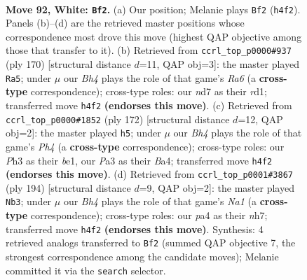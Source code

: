 \documentclass[11pt]{article}
\begin{document}
\clearpage

\begin{figure}[p]\centering
\begin{subfigure}{0.46\textwidth}\centering
\resizebox{\linewidth}{!}{%
\newchessgame
\chessboard[
  setfen={6k1/3n4/8/5P2/p4K1B/P6P/8/8 w - - 3 92},
  showmover=false,
  pgfstyle=straightmove, color=movearrow, markmove={h4-f2}
]}
\caption{}
\end{subfigure}\hfill
\begin{subfigure}{0.46\textwidth}\centering
\resizebox{\linewidth}{!}{%
\newchessgame
\chessboard[
  setfen={8/5k2/R7/6p1/6P1/4P3/5K2/3r4 w - - 37 86},
  showmover=false,
  pgfstyle=straightmove, color=movearrow, markmove={a6-a5}
]}
\caption{}
\end{subfigure}
\\[4pt]
\begin{subfigure}{0.46\textwidth}\centering
\resizebox{\linewidth}{!}{%
\newchessgame
\chessboard[
  setfen={8/8/3p1k2/3P4/B3K2P/8/8/4b3 w - - 14 87},
  showmover=false,
  pgfstyle=straightmove, color=movearrow, markmove={h4-h5}
]}
\caption{}
\end{subfigure}\hfill
\begin{subfigure}{0.46\textwidth}\centering
\resizebox{\linewidth}{!}{%
\newchessgame
\chessboard[
  setfen={2k5/5P1n/2PK4/8/8/8/p7/N7 w - - 11 98},
  showmover=false,
  pgfstyle=straightmove, color=movearrow, markmove={a1-b3}
]}
\caption{}
\end{subfigure}
\caption{\textbf{Move 92, White: \texttt{Bf2}.} (a) Our position; Melanie plays \texttt{Bf2} (\texttt{h4f2}). Panels (b)--(d) are the retrieved master positions whose correspondence most drove this move (highest QAP objective among those that transfer to it). (b) Retrieved from \texttt{ccrl\_top\_p0000\#937} (ply 170) [structural distance $d$=11, QAP obj=3]: the master played \texttt{Ra5}; under $\mu$ our \emph{Bh4} plays the role of that game's \emph{Ra6} (a \textbf{cross-type} correspondence); cross-type roles: our \emph{n}d7 as their \emph{r}d1; transferred move \texttt{h4f2} \textbf{(endorses this move)}. (c) Retrieved from \texttt{ccrl\_top\_p0000\#1852} (ply 172) [structural distance $d$=12, QAP obj=2]: the master played \texttt{h5}; under $\mu$ our \emph{Bh4} plays the role of that game's \emph{Ph4} (a \textbf{cross-type} correspondence); cross-type roles: our \emph{P}h3 as their \emph{b}e1, our \emph{P}a3 as their \emph{B}a4; transferred move \texttt{h4f2} \textbf{(endorses this move)}. (d) Retrieved from \texttt{ccrl\_top\_p0001\#3867} (ply 194) [structural distance $d$=9, QAP obj=2]: the master played \texttt{Nb3}; under $\mu$ our \emph{Bh4} plays the role of that game's \emph{Na1} (a \textbf{cross-type} correspondence); cross-type roles: our \emph{p}a4 as their \emph{n}h7; transferred move \texttt{h4f2} \textbf{(endorses this move)}. Synthesis: 4 retrieved analogs transferred to \texttt{Bf2} (summed QAP objective 7, the strongest correspondence among the candidate moves); Melanie committed it via the \texttt{search} selector.}
\label{fig:thought-m182}
\end{figure}
\end{document}
